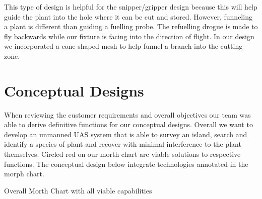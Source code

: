 \documentclass{wrcecapstone}
\begin{document}
This type of design is helpful for the snipper/gripper design because this will help guide the plant into the hole where it can be cut and stored.  However, funneling a plant is different than guiding a fuelling probe.  The refuelling drogue is made to fly backwards while our fixture is facing into the direction of flight.  In our design we incorporated a cone-shaped mesh to help funnel a branch into the cutting zone.





\section{Conceptual Designs}
When reviewing the customer requirements and overall objectives our team was able to derive definitive functions for our conceptual  designs. Overall we want to develop an unmanned UAS system that is able to survey an island, search and identify a species of plant and recover with minimal interference to the plant themselves. Circled red on our morth chart are viable solutions to respective functions. The conceptual design below integrate technologies annotated in the morph chart.
\begin{table}
\caption{Overall Morth Chart with all viable capabilities}
\end{table}
\end{document}
